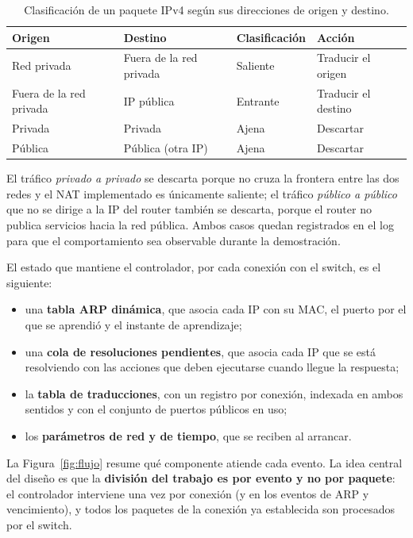 ﻿\documentclass[10pt,a4paper]{article}
\begin{document}
\begin{table}[H]
\centering
\begin{tabular}{llll}
\toprule
\textbf{Origen} & \textbf{Destino} & \textbf{Clasificación} & \textbf{Acción} \\
\midrule
Red privada & Fuera de la red privada & Saliente & Traducir el origen \\
Fuera de la red privada & IP pública & Entrante & Traducir el destino \\
Privada & Privada & Ajena & Descartar \\
Pública & Pública (otra IP) & Ajena & Descartar \\
\bottomrule
\end{tabular}
\caption{Clasificación de un paquete IPv4 según sus direcciones de origen y destino.}
\label{tab:clasif}
\end{table}

El tráfico \emph{privado a privado} se descarta porque no cruza la frontera entre las
dos redes y el NAT implementado es únicamente saliente; el tráfico \emph{público a
público} que no se dirige a la IP del router también se descarta, porque el router no
publica servicios hacia la red pública. Ambos casos quedan registrados en el log para
que el comportamiento sea observable durante la demostración.

El estado que mantiene el controlador, por cada conexión con el switch, es el
siguiente:

\begin{itemize}[nosep]
    \item una \textbf{tabla ARP dinámica}, que asocia cada IP con su MAC, el puerto
          por el que se aprendió y el instante de aprendizaje;
    \item una \textbf{cola de resoluciones pendientes}, que asocia cada IP que se
          está resolviendo con las acciones que deben ejecutarse cuando llegue la
          respuesta;
    \item la \textbf{tabla de traducciones}, con un registro por conexión, indexada
          en ambos sentidos y con el conjunto de puertos públicos en uso;
    \item los \textbf{parámetros de red y de tiempo}, que se reciben al arrancar.
\end{itemize}

La Figura~\ref{fig:flujo} resume qué componente atiende cada evento. La idea central
del diseño es que la \textbf{división del trabajo es por evento y no por paquete}: el
controlador interviene una vez por conexión (y en los eventos de ARP y vencimiento),
y todos los paquetes de la conexión ya establecida son procesados por el switch.
\end{document}
